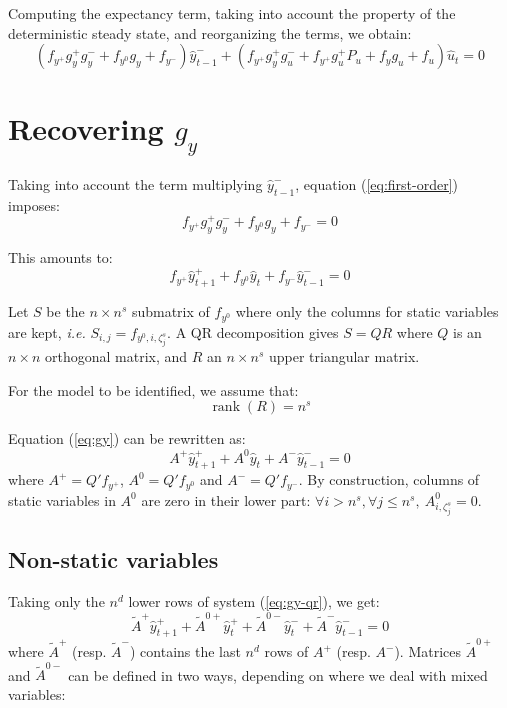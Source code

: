 \documentclass[11pt,a4paper]{article}
\begin{document}
Computing the expectancy term, taking into account the property of the deterministic steady state, and reorganizing the terms, we obtain:
\begin{equation}
  \label{eq:first-order}
  (f_{y^+} g^+_y g^-_y + f_{y^0}  g_y + f_{y^-}) \hat{y}^-_{t-1} + (f_{y^+} g^+_yg^-_u+ f_{y^+}g^+_u P_u + f_y g_u + f_u) \hat{u}_t = 0
\end{equation}

\section{Recovering $g_y$}

Taking into account the term multiplying $\hat{y}^-_{t-1}$, equation (\ref{eq:first-order}) imposes:
\begin{equation*}
  f_{y^+} g^+_y g^-_y + f_{y^0}  g_y + f_{y^-} = 0
\end{equation*}

This amounts to:
\begin{equation}
  \label{eq:gy}
  f_{y^+} \hat{y}^+_{t+1} + f_{y^0} \hat{y}_t + f_{y^-} \hat{y}^-_{t-1} = 0
\end{equation}

Let $S$ be the $n\times n^s$ submatrix of $f_{y^0}$ where only the columns for static variables are kept, \textit{i.e.} $S_{i,j} = f_{y^0, i, \zeta^s_j}$. A QR decomposition gives $S = QR$ where $Q$ is an $n\times n$ orthogonal matrix, and $R$ an $n\times n^s$ upper triangular matrix.

For the model to be identified, we assume that:
\begin{equation}
  \label{eq:identification}
  \mathop{rank}(R) = n^s
\end{equation}

Equation (\ref{eq:gy}) can be rewritten as:
\begin{equation}
  \label{eq:gy-qr}
  A^+ \hat{y}^+_{t+1} + A^0 \hat{y}_t + A^- \hat{y}^-_{t-1} = 0
\end{equation}
where $A^+ = Q'f_{y^+}$, $A^0 = Q'f_{y^0}$ and $A^- = Q'f_{y^-}$. By construction, columns of static variables in $A^0$ are zero in their lower part: $\forall i > n^s,\forall j\leq n^s, \: A^0_{i,\zeta^s_j} = 0$.

\subsection{Non-static variables}

Taking only the $n^d$ lower rows of system (\ref{eq:gy-qr}), we get:
\begin{equation}
  \label{eq:gy-no-static}
  \tilde{A}^+ \hat{y}^+_{t+1} + \tilde{A}^{0+} \hat{y}^+_t + \tilde{A}^{0-} \hat{y}^-_t + \tilde{A}^- \hat{y}^-_{t-1} = 0
\end{equation}
where $\tilde{A}^+$ (resp. $\tilde{A}^-$) contains the last $n^d$ rows of $A^+$ (resp. $A^-$). Matrices $\tilde{A}^{0+}$ and $\tilde{A}^{0-}$ can be defined in two ways, depending on where we deal with mixed variables:
\end{document}
